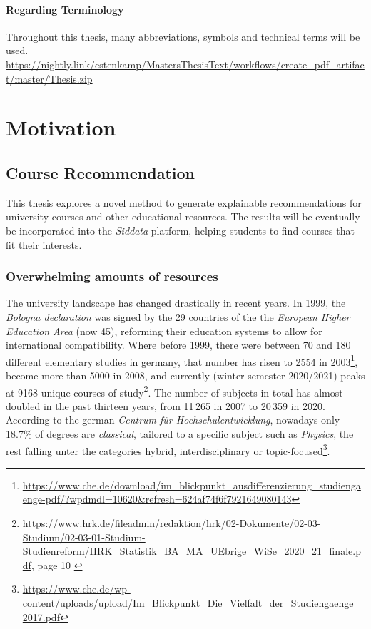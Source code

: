 \paragraph*{Regarding Terminology}

Throughout this thesis, many abbreviations, symbols and technical terms will be used.    \url{https://nightly.link/cstenkamp/MastersThesisText/workflows/create_pdf_artifact/master/Thesis.zip}

\section{Motivation}

\subsection{Course Recommendation}

This thesis explores a novel method to generate explainable recommendations for university-courses and other educational resources. The results will be eventually be incorporated into the \emph{Siddata}-platform, helping students to find courses that fit their interests.

\subsubsection*{Overwhelming amounts of resources}

The university landscape has changed drastically in recent years. In 1999, the \textit{Bologna declaration} was signed by the 29 countries of the the \textit{European Higher Education Area} (now 45), reforming their education systems to allow for international compatibility. Where before 1999, there were between 70 and 180 different elementary studies \cite{Schroder2015} in germany, that number has risen to 2554 in 2003\footnote{\url{https://www.che.de/download/im_blickpunkt_ausdifferenzierung_studiengaenge-pdf/?wpdmdl=10620&refresh=624af74f6f7921649080143}}, become more than 5000 in 2008, and currently (winter semester 2020/2021) peaks at 9168 unique courses of study\footnote{\url{https://www.hrk.de/fileadmin/redaktion/hrk/02-Dokumente/02-03-Studium/02-03-01-Studium-Studienreform/HRK_Statistik_BA_MA_UEbrige_WiSe_2020_21_finale.pdf}, page 10 \label{fnote:degreenums}}. The number of subjects in total has almost doubled in the past thirteen years, from 11\,265 in 2007 to 20\,359 in 2020. According to the german \textit{Centrum für Hochschulentwicklung}, nowadays only 18.7\% of degrees are \textit{classical}, \ie tailored to a specific subject such as \textit{Physics}, the rest falling unter the categories hybrid, interdisciplinary or topic-focused\footnote{\url{https://www.che.de/wp-content/uploads/upload/Im_Blickpunkt_Die_Vielfalt_der_Studiengaenge_2017.pdf}}.

